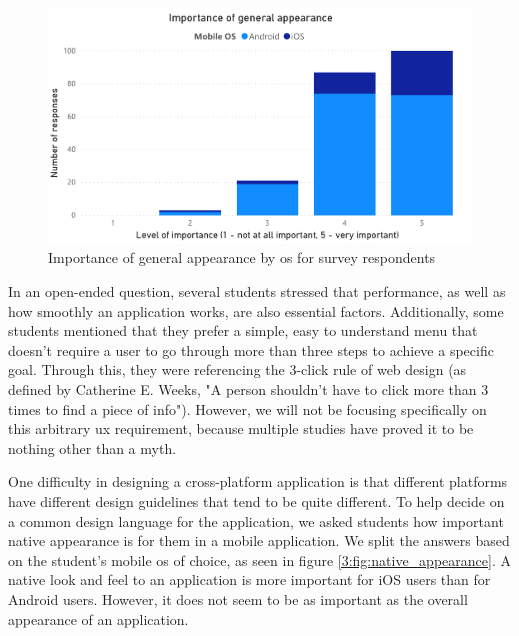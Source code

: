 \begin{figure}[ht]
    \centering
         \includegraphics[width=\textwidth]{figures/charts/survey/appearance.pdf}
    \caption{Importance of general appearance by \acrshort{os} for survey respondents}
    \label{3:fig:appearance}
\end{figure}

In an open-ended question, several students stressed that performance, as well as how smoothly an application works, are also essential factors. Additionally, some students mentioned that they prefer a simple, easy to understand menu that doesn't require a user to go through more than three steps to achieve a specific goal. Through this, they were referencing the 3-click rule of web design (as defined by Catherine E. Weeks\cite{weeks1997design}, "A person shouldn't have to click more than 3 times to find a piece of info"). However, we will not be focusing specifically on this arbitrary \acrshort{ux} requirement, because multiple studies\cite{porter2003testing}\cite{nielsen2006prioritizing} have proved it to be nothing other than a myth.

One difficulty in designing a cross-platform application is that different platforms have different design guidelines that tend to be quite different\cite{thirumala2017interaction}. To help decide on a common design language for the application, we asked students how important native appearance is for them in a mobile application. We split the answers based on the student's mobile \acrshort{os} of choice, as seen in figure \ref{3:fig:native_appearance}. A native look and feel to an application is more important for iOS users than for Android users. However, it does not seem to be as important as the overall appearance of an application.

